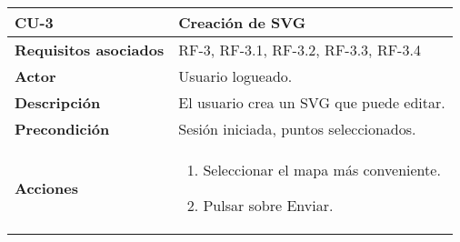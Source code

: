 \begin{longtable}[H]{@{}l|l@{}}
	\toprule
	\begin{minipage}[b]{0.23\columnwidth}\raggedright\strut
		\textbf{CU-3}\strut
	\end{minipage} & \begin{minipage}[b]{0.71\columnwidth}\raggedright\strut
		\textbf{Creación de SVG}\strut
	\end{minipage}\tabularnewline
	\toprule
	\endhead
	\begin{minipage}[t]{0.23\columnwidth}\raggedright\strut
		\textbf{Requisitos asociados}\strut
	\end{minipage} & \begin{minipage}[t]{0.71\columnwidth}\raggedright\strut
		RF-3, RF-3.1, RF-3.2, RF-3.3, RF-3.4\strut
	\end{minipage}\tabularnewline
	\midrule
	\begin{minipage}[t]{0.23\columnwidth}\raggedright\strut
		\textbf{Actor}\strut
	\end{minipage} & \begin{minipage}[t]{0.71\columnwidth}\raggedright\strut
		Usuario logueado.\strut
	\end{minipage}\tabularnewline
	\midrule
	\begin{minipage}[t]{0.23\columnwidth}\raggedright\strut
		\textbf{Descripción}\strut
	\end{minipage} & \begin{minipage}[t]{0.71\columnwidth}\raggedright\strut
		El usuario crea un SVG que puede editar.\strut
	\end{minipage}\tabularnewline
	\midrule
	\begin{minipage}[t]{0.23\columnwidth}\raggedright\strut
		\textbf{Precondición}\strut
	\end{minipage} & \begin{minipage}[t]{0.71\columnwidth}\raggedright\strut
		Sesión iniciada, puntos seleccionados.\strut
	\end{minipage}\tabularnewline
	\midrule
	\begin{minipage}[t]{0.23\columnwidth}\raggedright\strut
		\textbf{Acciones}\strut
	\end{minipage} & \begin{minipage}[t]{0.71\columnwidth}\raggedright\strut
		\begin{enumerate}
			\def\labelenumi{\arabic{enumi}.}
			\tightlist
			\item Seleccionar el mapa más conveniente.
			\item Pulsar sobre Enviar.

\end{enumerate}
\end{minipage}
\end{longtable}
